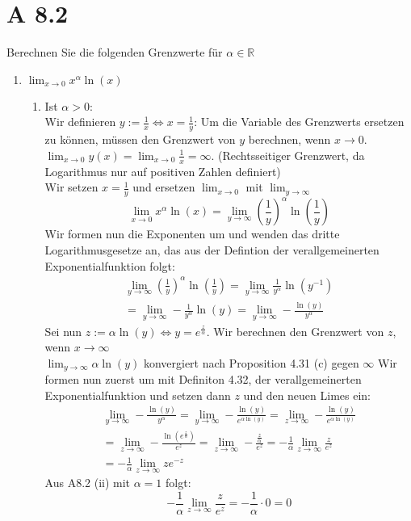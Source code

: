 \documentclass{article}
\begin{document}
    \section*{A 8.2}
    Berechnen Sie die folgenden Grenzwerte für \(\alpha \in \mathbb{R} \)
    \begin{enumerate}[ label = (\roman*) ]
        \item \( \lim_{x \to 0} x^{\alpha} \ln(x) \) \\
        
        \begin{enumerate}[ label = \arabic*. Fall]
            \item Ist \(\alpha > 0\): \\
            Wir definieren \(y := \frac{1}{x} \Leftrightarrow x = \frac{1}{y}\):
            Um die Variable des Grenzwerts ersetzen zu können, müssen den Grenzwert von \(y\) berechnen, wenn \(x \to 0\). \\
            \( \lim_{x \to 0} y(x) = \lim_{x \to 0} \frac{1}{x} = \infty \). (Rechtsseitiger Grenzwert, da Logarithmus nur auf positiven Zahlen definiert) \\
            Wir setzen \(x = \frac{1}{y}\) und ersetzen \(\lim_{x \to 0}\) mit \(\lim_{y \to \infty}\)
            \[ \lim_{x \to 0} x^{\alpha} \ln(x) = \lim_{y \to \infty} { \left( \frac{1}{y} \right) }^{\alpha} \ln(\frac{1}{y}) \]
            Wir formen nun die Exponenten um und wenden das dritte Logarithmusgesetze an, das aus der Defintion der verallgemeinerten Exponentialfunktion folgt:
            \begin{gather*}
                \lim_{y \to \infty} { \left( \frac{1}{y} \right) }^{\alpha} \ln(\frac{1}{y}) = \lim_{y \to \infty} \frac{1}{y^{\alpha}} \ln(y^{-1}) \\
                = \lim_{y \to \infty} -\frac{1}{y^{\alpha}} \ln(y) = \lim_{y \to \infty} -\frac{\ln(y)}{y^{\alpha}} 
            \end{gather*}
            Sei nun \(z := \alpha \ln(y) \Leftrightarrow y = e^{\frac{z}{\alpha}} \). Wir berechnen den Grenzwert von \(z\), wenn \( x \to \infty \) \\
            \( \lim_{y \to \infty} \alpha \ln(y)\) konvergiert nach Proposition 4.31 (c) gegen \( \infty \)
            Wir formen nun zuerst um mit Definiton 4.32, der verallgemeinerten Exponentialfunktion und setzen dann \(z\) und den neuen Limes ein:
            \begin{gather*}
                \lim_{y \to \infty} -\frac{\ln(y)}{y^{\alpha}} = \lim_{y \to \infty} -\frac{\ln(y)}{e^{\alpha \ln(y)}} 
                = \lim_{z \to \infty} -\frac{\ln(y)}{e^{\alpha \ln(y)}} \\
                = \lim_{z \to \infty} -\frac{\ln(e^{\frac{z}{\alpha}})}{e^{z}}
                = \lim_{z \to \infty} -\frac{\frac{z}{\alpha}}{e^z} = -\frac{1}{\alpha} \lim_{z \to \infty} \frac{z}{e^z} \\
                = -\frac{1}{\alpha} \lim_{z \to \infty} z e^{-z}
            \end{gather*}
            Aus A8.2 (ii) mit \(\alpha = 1\) folgt:
            \[ -\frac{1}{\alpha} \lim_{z \to \infty} \frac{z}{e^z} = -\frac{1}{\alpha} \cdot 0 = 0 \]


\end{enumerate}
\end{enumerate}
\end{document}
